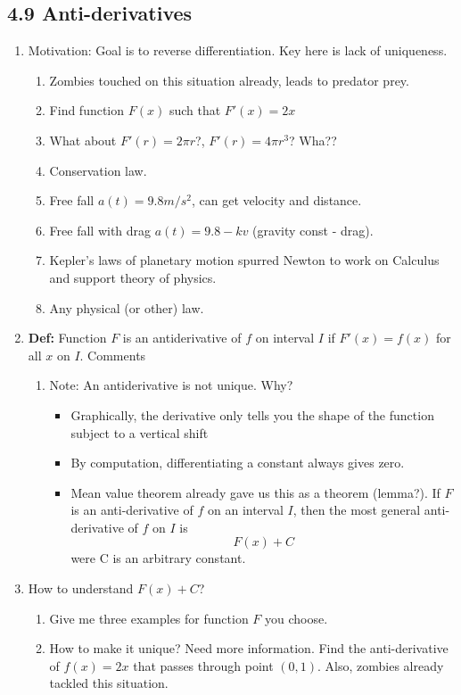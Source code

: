 \documentclass{article}
\begin{document}
\subsection{4.9 Anti-derivatives}
\begin{enumerate}

\item Motivation: Goal is to reverse differentiation. Key here is lack of uniqueness.
\begin{enumerate}
\item Zombies touched on this situation already, leads to predator prey.
\item Find function $F(x)$ such that $F'(x) = 2x$
\item What about $F'(r) = 2\pi r$?, $F'(r) = 4\pi r^3$? Wha??
\item Conservation law.
\item Free fall $a(t) = 9.8 m/s^2$, can get velocity and distance.
\item Free fall with drag $a(t) = 9.8 - kv$ (gravity const - drag).
\item Kepler's laws of planetary motion spurred Newton to work on Calculus and support theory of physics.
\item Any physical (or other) law.
\end{enumerate}

\item {\bf Def:} Function $F$ is an antiderivative of $f$ on interval $I$ if $F'(x) = f(x)$ for all $x$ on $I$.
Comments
\begin{enumerate}
\item Note: An antiderivative is not unique. Why?
\begin{itemize}
\item Graphically, the derivative only tells you the shape of the function subject to a vertical shift
\item By computation, differentiating a constant always gives zero.
\item Mean value theorem already gave us this as a theorem (lemma?).  If $F$ is an anti-derivative of $f$ on an interval $I$, then the most general anti-derivative of $f$ on $I$ is $$
F(x)+C
$$
were C is an arbitrary constant.
\end{itemize}
\end{enumerate}

\item How to understand $F(x)+C$? 
\begin{enumerate}
\item Give me three examples for function $F$ you choose. 
\item How to make it unique? Need more information. Find the anti-derivative of  $f(x)=2x$ that passes through point $(0,1)$. Also, zombies already tackled this situation.
\end{enumerate}


\end{enumerate}
\end{document}
